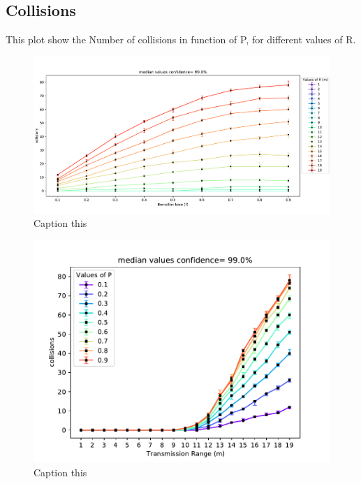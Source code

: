 \subsection{Collisions}
This plot show the Number of collisions in function of P, for different values of R.
\begin{figure}[H]
    \begin{center}
        \includegraphics[scale=.4]{img/Big_CollP_median.pdf}
    \end{center}
    \vspace*{-0.5cm}
    \caption{Caption this}
    \label{fig:floorplancoverage5}
\end{figure}
\begin{figure}[H]
    \begin{center}
        \includegraphics[scale=.7]{img/Big_CollRange_median.pdf}
    \end{center}
    \vspace*{-0.5cm}
    \caption{Caption this}
    \label{fig:floorplancoverage6}
\end{figure}

